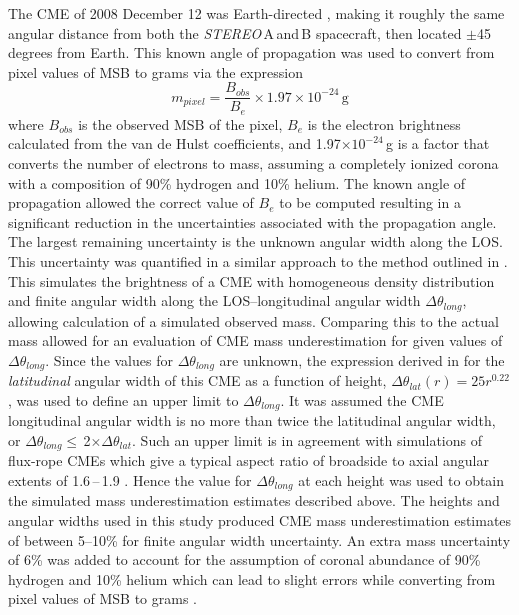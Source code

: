 The CME of 2008 December 12 was Earth-directed \citep{byr10}, making it roughly the same angular distance from both the \emph{STEREO}\,A\,and\,B spacecraft, then located $\pm$45 degrees from Earth. This known angle of propagation was used to convert from pixel values of MSB to grams via the expression
\begin{equation}
m_{pixel}=\frac{B_{obs}}{B_{e}}\times1.97\times10^{-24}\,\mathrm{g}
\end{equation}
where $B_{obs}$ is the observed MSB of the pixel, $B_{e}$ is the electron brightness calculated from the van de Hulst coefficients, and 1.97$ \times10^{-24}$\,g is a factor that converts the number of electrons to mass, assuming a completely ionized corona with a composition of 90\% hydrogen and 10\% helium. The known angle of propagation allowed the correct value of $B_{e}$ to be computed resulting in a significant reduction in the uncertainties associated with the propagation angle. The largest remaining uncertainty is the unknown angular width along the LOS. This uncertainty was quantified in a similar approach to the method outlined in \citet{vou00}. This simulates the brightness of a CME with 
homogeneous density distribution and finite angular width along the LOS--longitudinal angular width $\Delta$$\theta_{long}$, allowing calculation of a simulated observed mass. Comparing this to the actual mass allowed for an evaluation of CME mass underestimation for given values of $\Delta$$\theta_{long}$.  Since the values for $\Delta$$\theta_{long}$ are unknown, the expression derived in \citet{byr10} for the \emph{latitudinal} 
angular width of this CME as a function of height, $\Delta$$\theta_{lat}$$(r)=25r^{0.22}$, was used to define an upper limit to $\Delta$$\theta_{long}$. It was assumed the CME longitudinal angular width is no more than twice the latitudinal angular width, or $\Delta$$\theta_{long}$$\leqslant$\,2$\times$$\Delta$$\theta_{lat}$. Such an upper limit is in agreement with simulations of flux-rope CMEs which give a typical aspect ratio of broadside to axial angular extents of 1.6\,--\,1.9 \citep{krall2006}. Hence the value for $\Delta$$\theta_{long}$ at each height was used to obtain the simulated mass underestimation estimates described above. The heights and angular widths used in this study produced CME mass underestimation estimates of between 5--10\% for finite angular width uncertainty. An extra mass uncertainty of 6\% was added to account for the assumption of coronal abundance of 90\% hydrogen and 10\% helium which can lead to slight errors while converting from pixel values of MSB to grams \citep{vour2010}. 


